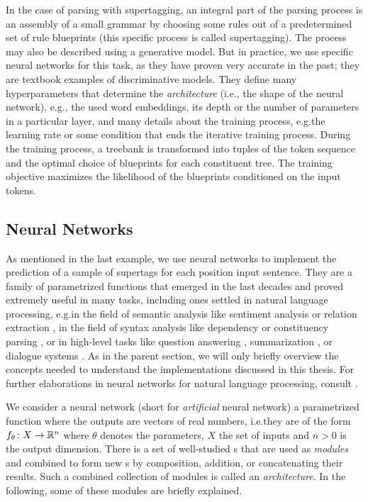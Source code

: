 \documentclass[../document.tex]{subfiles}
\begin{document}
    \begin{example}
        In the case of parsing with supertagging, an integral part of the parsing process is an assembly of a small grammar by choosing some rules out of a predetermined set of rule blueprints (this specific process is called supertagging).
        The process may also be described using a generative model.
        But in practice, we use specific neural networks for this task, as they have proven very accurate in the past; they are textbook examples of discriminative models.
        They define many hyperparameters that determine the \emph{architecture} (i.e., the shape of the neural network), e.g.\@, the used word embeddings, its depth or the number of parameters in a particular layer, and many details about the training process, e.g.\@ the learning rate or some condition that ends the iterative training process.
        During the training process, a treebank is transformed into tuples of the token sequence and the optimal choice of blueprints for each constituent tree.
        The training objective maximizes the likelihood of the blueprints conditioned on the input tokens.
    \end{example}

    \subsection{Neural Networks}\label{sec:preliminaries:nn}
    As mentioned in the last example, we use neural networks to implement the prediction of a sample of supertags for each position input sentence.
    They are a family of parametrized functions that emerged in the last decades and proved extremely useful in many tasks, including ones settled in natural language processing, e.g.\@ in the field of semantic analysis like sentiment analysis \citep{sentiment} or relation extraction \citep{relationextraction}, in the field of syntax analysis like dependency \citep{dependencyparsing} or constituency parsing \citep{FerGom20a}, or in high-level tasks like question answering \cite{Devlin2019}, summarization \cite{bertgeneration}, or dialogue systems \cite{dialoguesystems}.
    As in the parent section, we will only briefly overview the concepts needed to understand the implementations discussed in this thesis.
    For further elaborations in neural networks for natural language processing, consult \citet{Gol22}.

    We consider a neural network (short  for \emph{artificial} neural network) a parametrized function where the outputs are vectors of real numbers, i.e.\@ they are of the form \(f_\theta\colon X \to \mathbb{R}^n\) where \(\theta\) denotes the parameters, \(X\) the set of inputs and \(n > 0\) is the output dimension.
    There is a set of well-studied s that are used as \emph{modules} and combined to form new s by composition, addition, or concatenating their results.
    Such a combined collection of modules is called an \emph{architecture}.
    In the following, some of these modules are briefly explained.
\end{document}
